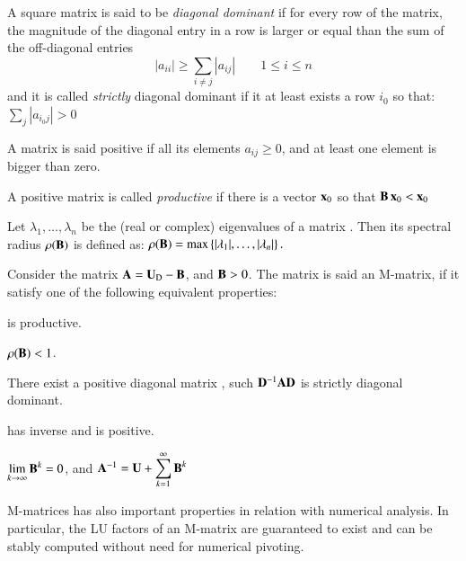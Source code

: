 \documentclass{ecos}
\begin{document}
A square matrix  is said to be \emph{diagonal dominant} if for every row of the matrix, the magnitude of the diagonal entry in a row is larger or equal than the sum of the off-diagonal entries
\[ \left|a_{ii}\right| \geq \sum_{i \neq j} {\left|a_{ij}\right|}
\qquad 1 \leq i \leq n \]
and it is called \emph{strictly} diagonal dominant if it at least exists a row $i_0$
so that: $\sum_{j}{\left| a_{i_0 j} \right|} > 0$

A matrix  is said positive if all its elements $a_{ij}\ge0$, and at least one element is bigger than zero.

A positive matrix  is called \emph{productive} \cite{Gale89} if there is a vector $\mathbf{x}_0$ so that
$\mathbf{B}\,\mathbf{x}_0 < \mathbf{x}_0$

Let $\lambda _{1},\dotsc ,\lambda _{n}$ be the (real or complex) eigenvalues of a matrix . Then its spectral radius $\rho(\mathbf{B})$ is defined as:
\(\displaystyle \rho (\mathbf{B})=\max \left\{|\lambda _{1}|,\dotsc ,|\lambda _{n}|\right\}.\)

Consider the matrix $\mathbf{A}=\mathbf{U}_\mathrm{D}-\mathbf{B}$, and $\mathbf{B}>0$. The matrix  is said an M-matrix, if it satisfy one of the following equivalent properties:
\begin{compactenum}[(i)]
	\item {} is productive.
	\item $\rho(\mathbf{B})<1$.
	\item There exist a positive diagonal matrix , such $\mathbf{D}^{-1}\mathbf{A}\mathbf{D}$ is strictly diagonal dominant.
	\item {} has inverse and  is positive.
	\item $\displaystyle{\lim_{k\rightarrow\infty}\ensuremath{\mathbf{B}}^k=0}$, and 
	$\mathbf{A}^{-1}=\mathbf{U}+\displaystyle{\sum_{k=1}^{\infty}{\ensuremath{\mathbf{B}}^{k}}}$	
\end{compactenum}	
M-matrices has also important properties in relation with numerical analysis. In particular, the LU factors of an M-matrix are guaranteed to exist and can be stably computed
without need for numerical pivoting.
	
\end{document}
